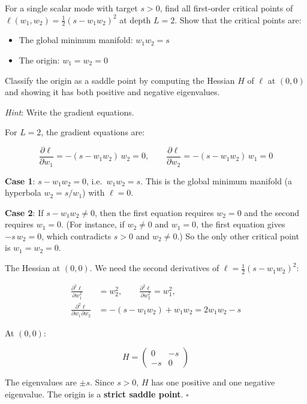 \documentclass[11pt]{article}
\providecommand{\tightlist}{%
  \setlength{\itemsep}{0pt}\setlength{\parskip}{0pt}}
\begin{document}
\begin{exercise}
\label{ex:td-1b}
For a single scalar mode with target \(s > 0\), find all
first-order critical points of
\(\ell(w_1, w_2) = \frac{1}{2}(s - w_1 w_2)^2\) at depth \(L = 2\). Show
that the critical points are:

\begin{itemize}
\tightlist
\item
  The global minimum manifold: \(w_1 w_2 = s\)
\item
  The origin: \(w_1 = w_2 = 0\)
\end{itemize}

Classify the origin as a saddle point by computing the Hessian \(H\) of
\(\ell\) at \((0,0)\) and showing it has both positive and negative
eigenvalues.

\emph{Hint}: Write the gradient equations.
\end{exercise}

\begin{solution}[ex:td-1b]
For \(L = 2\), the gradient equations are:

\[\frac{\partial \ell}{\partial w_1} = -(s - w_1 w_2)\,w_2 = 0, \qquad \frac{\partial \ell}{\partial w_2} = -(s - w_1 w_2)\,w_1 = 0\]

\textbf{Case 1}: \(s - w_1 w_2 = 0\), i.e.~\(w_1 w_2 = s\). This is the
global minimum manifold (a hyperbola \(w_2 = s/w_1\)) with \(\ell = 0\).

\textbf{Case 2}: If \(s - w_1 w_2 \neq 0\), then the first equation
requires \(w_2 = 0\) and the second requires \(w_1 = 0\). (For instance,
if \(w_2 \neq 0\) and \(w_1 = 0\), the first equation gives
\(-s\,w_2 = 0\), which contradicts \(s > 0\) and \(w_2 \neq 0\).) So the
only other critical point is \(w_1 = w_2 = 0\).

The Hessian at \((0,0)\). We need the second derivatives of
\(\ell = \frac{1}{2}(s - w_1 w_2)^2\):

\begin{align*}
\frac{\partial^2 \ell}{\partial w_1^2} &= w_2^2, \qquad \frac{\partial^2 \ell}{\partial w_2^2} = w_1^2, \\
\frac{\partial^2 \ell}{\partial w_1 \partial w_2} &= -(s - w_1 w_2) + w_1 w_2 = 2w_1 w_2 - s
\end{align*}

At \((0,0)\):

\[H = \begin{pmatrix} 0 & -s \\ -s & 0 \end{pmatrix}\]

The eigenvalues are \(\pm s\). Since \(s > 0\), \(H\) has one positive
and one negative eigenvalue. The origin is a \textbf{strict saddle
point}. \(\square\)
\end{solution}
\end{document}
